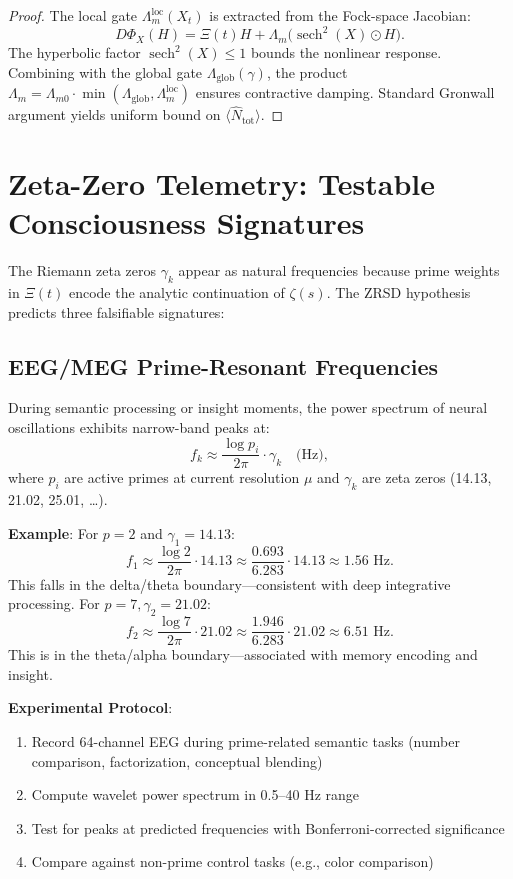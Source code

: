 \documentclass[12pt]{amsart}
\theoremstyle{plain}
\begin{document}
\begin{proof}
The local gate \(\Lambda_m^{\text{loc}}(X_t)\) is extracted from the Fock-space Jacobian:
\[
D\Phi_X(H) = \Xi(t) H + \Lambda_m \bigl( \operatorname{sech}^2(X) \odot H \bigr).
\]
The hyperbolic factor \(\operatorname{sech}^2(X) \leq 1\) bounds the nonlinear response. Combining with the global gate \(\Lambda_{\text{glob}}(\gamma)\), the product \(\Lambda_m = \Lambda_{m0} \cdot \min(\Lambda_{\text{glob}}, \Lambda_m^{\text{loc}})\) ensures contractive damping. Standard Gronwall argument yields uniform bound on \(\langle \hat{N}_{\text{tot}} \rangle\).
\end{proof}

\section{Zeta-Zero Telemetry: Testable Consciousness Signatures}\label{sec:telemetry}

The Riemann zeta zeros \(\gamma_k\) appear as natural frequencies because prime weights in \(\Xi(t)\) encode the analytic continuation of \(\zeta(s)\). The ZRSD hypothesis predicts three falsifiable signatures:

\subsection{EEG/MEG Prime-Resonant Frequencies}

\begin{prediction}\label{pred:eeg}
During semantic processing or insight moments, the power spectrum of neural oscillations exhibits narrow-band peaks at:
\[
f_k \approx \frac{\log p_i}{2\pi} \cdot \gamma_k \quad \text{(Hz)},
\]
where \(p_i\) are active primes at current resolution \(\mu\) and \(\gamma_k\) are zeta zeros (14.13, 21.02, 25.01, \ldots).
\end{prediction}

\textbf{Example}: For \(p = 2\) and \(\gamma_1 = 14.13\):
\[
f_1 \approx \frac{\log 2}{2\pi} \cdot 14.13 \approx \frac{0.693}{6.283} \cdot 14.13 \approx 1.56 \text{ Hz}.
\]
This falls in the delta/theta boundary---consistent with deep integrative processing. For \(p = 7, \gamma_2 = 21.02\):
\[
f_2 \approx \frac{\log 7}{2\pi} \cdot 21.02 \approx \frac{1.946}{6.283} \cdot 21.02 \approx 6.51 \text{ Hz}.
\]
This is in the theta/alpha boundary---associated with memory encoding and insight.

\textbf{Experimental Protocol}:
\begin{enumerate}
\item Record 64-channel EEG during prime-related semantic tasks (number comparison, factorization, conceptual blending)
\item Compute wavelet power spectrum in 0.5--40 Hz range
\item Test for peaks at predicted frequencies with Bonferroni-corrected significance
\item Compare against non-prime control tasks (e.g., color comparison)
\end{enumerate}
\end{document}
